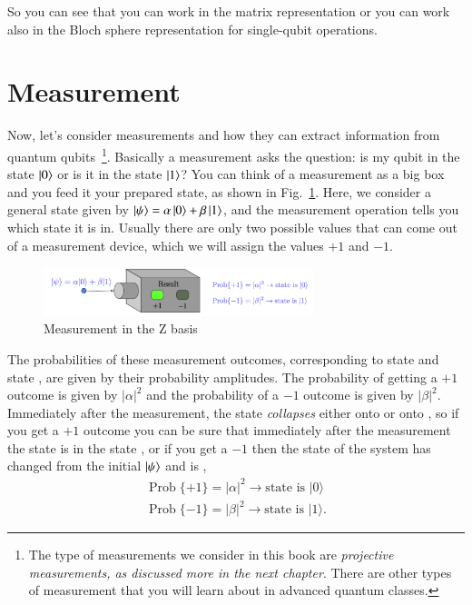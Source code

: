 So you can see that you can work in the matrix representation or you can work also in the Bloch sphere representation for single-qubit operations.



\section{Measurement}
\label{sec:measurement}


Now, let's consider measurements and how they can extract information from quantum qubits~\footnote{The type of measurements we consider in this book are \emph{projective measurements, as discussed more in the next chapter}. There are other types of measurement that you will learn about in advanced quantum classes.}. Basically a measurement asks the question: is my qubit in the state $\left| 0 \right\rangle$ or is it in the state $\left| 1 \right\rangle$? You can think of a measurement as a big box and you feed it your prepared state, as shown in Fig.~\ref{fig:z-measure}. Here, we consider a general state given by $\left| \psi \right\rangle = \alpha\left| 0 \right\rangle+\beta\left| 1 \right\rangle$, and the measurement operation tells you which state it is in. Usually there are only two possible values that can come out of a measurement device, which we will assign the values $+1$ and $-1$.

\begin{figure}[H]
    \centering
    \includegraphics[width=0.7\textwidth]{lesson2/Pauli_z_machine.pdf}
    
        \caption{Measurement in the Z basis}
    
    \label{fig:z-measure}
\end{figure}

The probabilities of these measurement outcomes, corresponding to state  and state , are given by their probability amplitudes. The probability of getting a $+1$ outcome is given by $|\alpha|^2$ and the probability of a $-1$ outcome is given by $|\beta|^2$. Immediately after the measurement, the state \emph{collapses} either onto  or onto , so if you get a $+1$ outcome you can be sure that immediately after the measurement the state is in the state , or if you get a $-1$ then the state of the system has changed from the initial $\left| \psi \right\rangle$ and is ,
\begin{align}
\operatorname{Prob}\{+1\}=|\alpha|^2 \rightarrow \textrm{state is } |0\rangle \\
\operatorname{Prob}\{-1\}=|\beta|^2 \rightarrow \textrm{state is } |1\rangle.
\end{align}


